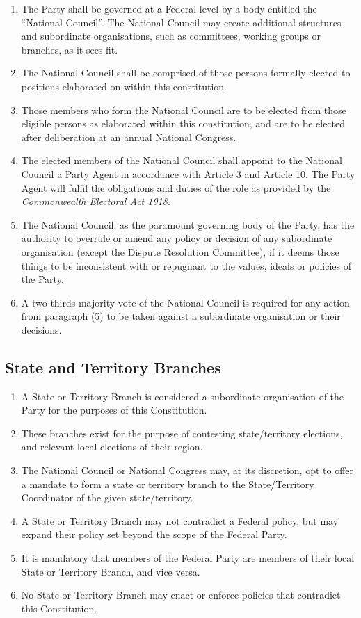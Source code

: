 \documentclass[a4paper,titlepage,8.5pt]{article}
\begin{document}
\begin{enumerate}
\item The Party shall be governed at a Federal level by a body entitled the ``National Council''. The National Council may create additional structures and subordinate organisations, such as committees, working groups or branches, as it sees fit.
\item The National Council shall be comprised of those persons formally elected to positions elaborated on within this constitution.
\item Those members who form the National Council are to be elected from those eligible persons as elaborated within this constitution, and are to be elected after deliberation at an annual National Congress.
\item The elected members of the National Council shall appoint to the National Council a Party Agent in accordance with Article 3 and Article 10. The Party Agent will fulfil the obligations and duties of the role as provided by the \textit{Commonwealth Electoral Act 1918}.
\item The National Council, as the paramount governing body of the Party, has the authority to overrule or amend any policy or decision of any subordinate organisation (except the Dispute Resolution Committee), if it deems those things to be inconsistent with or repugnant to the values, ideals or policies of the Party.
\item A two-thirds majority vote of the National Council is required for any action from paragraph (5) to be taken against a subordinate organisation or their decisions.
\end{enumerate}

\subsection{State and Territory Branches}

\begin{enumerate}
\item A State or Territory Branch is considered a subordinate organisation of the Party for the purposes of this Constitution.
\item These branches exist for the purpose of contesting state/territory elections, and relevant local elections of their region.
\item The National Council or National Congress may, at its discretion, opt to offer a mandate to form a state or territory branch to the State/Territory Coordinator of the given state/territory.
\item A State or Territory Branch may not contradict a Federal policy, but may expand their policy set beyond the scope of the Federal Party.
\item It is mandatory that members of the Federal Party are members of their local State or Territory Branch, and vice versa.
\item No State or Territory Branch may enact or enforce policies that contradict this Constitution.
\end{enumerate}
\end{document}
